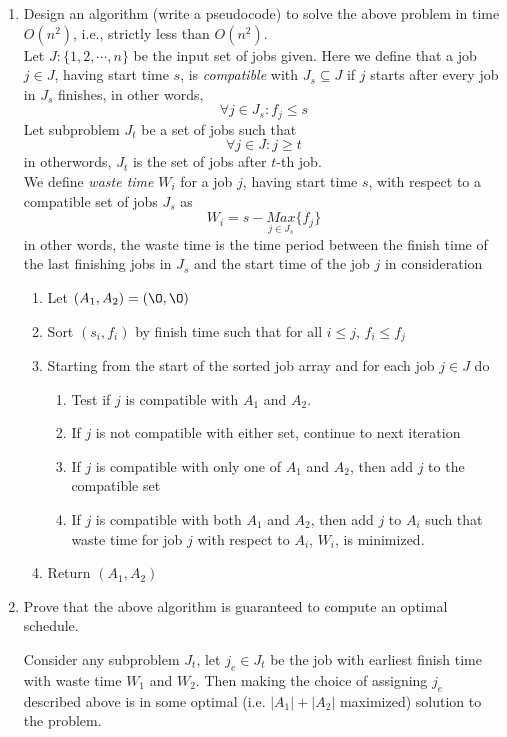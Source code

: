 \documentclass[11pt]{article}
\begin{document}
\begin{enumerate}
  \item Design an algorithm (write a pseudocode) to solve the above problem in time $O(n^2)$, i.e., strictly less than $O(n^2)$.\\

  Let $J: \{ 1, 2, \cdots, n\}$ be the input set of jobs given. Here we define that a job $j\in J$, having start time $s$, is \textit{compatible} with $J_s\subseteq J$ if $j$ starts after every job in $J_s$ finishes, in other words,
  \[
    \forall j \in J_s: f_j \leq s
  \]
  Let subproblem $J_t$ be a set of jobs such that
  \[
    \forall j \in J: j \geq t
  \]
  in otherwords, $J_t$ is the set of jobs after $t$-th job. \\
  We define \textit{waste time} $W_i$ for a job $j$, having start time $s$, with respect to a compatible set of jobs $J_s$ as
  \[
    W_i = s - \underset{j\in J_s}{Max}\{ f_j \}
  \]
  in other words, the waste time is the time period between the finish time of the last finishing jobs in $J_s$ and the start time of the job $j$ in consideration

  \begin{enumerate}
    \item Let $(A_1, A_2) = (\O, \O)$
    \item Sort $(s_i, f_i)$ by finish time such that for all $i\leq j$, $f_i \leq f_j$
    \item Starting from the start of the sorted job array and for each job $j \in J$ do
    \begin{enumerate}
      \item Test if $j$ is compatible with $A_1$ and $A_2$.
      \item If $j$ is not compatible with either set, continue to next iteration
      \item If $j$ is compatible with only one of $A_1$ and $A_2$, then add $j$ to the compatible set
      \item If $j$ is compatible with both $A_1$ and $A_2$, then add $j$ to $A_i$ such that waste time for job $j$ with respect to $A_i$, $W_i$, is minimized.
    \end{enumerate}
    \item Return $(A_1, A_2)$
  \end{enumerate}


  \item Prove that the above algorithm is guaranteed to compute an optimal schedule.

  \begin{proposition*}
    Consider any subproblem $J_t$, let $j_e\in J_t$ be the job with earliest finish time with waste time $W_1$ and $W_2$. Then making the choice of assigning $j_e$ described above is in some optimal (i.e. $|A_1| + |A_2|$ maximized) solution to the problem.
  \end{proposition*}


\end{enumerate}
\end{document}
